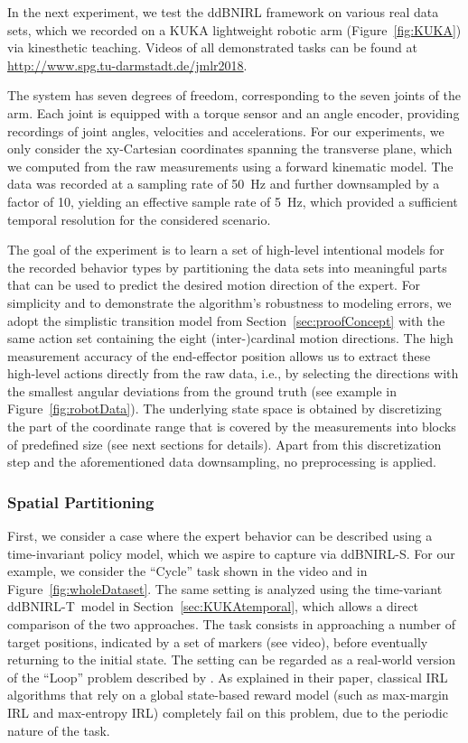 \documentclass[twoside,11pt]{article}
\newcommand{\ie}{i.e.}
\newcommand{\ddBNIRLT}{\mbox{ddBNIRL-T}}
\begin{document}
%
%
In the next experiment, we test the ddBNIRL framework on various real data sets, which we
recorded on a KUKA lightweight robotic arm (Figure~\ref{fig:KUKA}) via kinesthetic teaching. Videos of all demonstrated 
tasks %
can be found at \url{http://www.spg.tu-darmstadt.de/jmlr2018}.

The system has seven degrees of freedom, corresponding to the seven joints of the arm. Each joint is equipped with a torque sensor and an angle encoder, providing recordings of joint angles, velocities and accelerations. For our experiments, 
we only consider the xy-Cartesian coordinates spanning the transverse plane, %
which we computed from the raw measurements using a forward kinematic model. The data was recorded at a sampling rate of \SI{50}{\hertz} %
and %
further downsampled by a factor of 10, yielding an effective sample rate of \SI{5}{\hertz}, which provided a sufficient temporal resolution for the considered scenario. %



The goal of %
%
the experiment is to learn a set of high-level intentional models for the %
recorded behavior types by partitioning the %
data sets into %
meaningful %
parts that can be used to predict the desired motion direction of the expert. 
%
For simplicity and to demonstrate the algorithm's robustness to modeling errors, we adopt the simplistic transition model from Section~\ref{sec:proofConcept} with the same action set %
containing 
the eight %
(inter-)cardinal motion directions. The high measurement accuracy of the end-effector position allows us to extract these high-level actions %
%
directly from the %
raw data, \ie, by selecting %
%
%
the directions with the smallest %
angular deviations from the %
ground truth
%
(see example in Figure~\ref{fig:robotData}). %
%
The underlying 
state space is obtained by discretizing the %
part of the coordinate %
range that is 
covered by the measurements into blocks of %
predefined size (see next sections for details). Apart from this discretization step and the aforementioned data downsampling, no preprocessing %
is applied. 

\subsubsection{Spatial Partitioning}
First, we consider a case where the expert behavior can be described using a time-invariant policy model, which we aspire to capture via ddBNIRL-S. For our example, we %
consider the ``Cycle'' task shown in the video and in Figure~\ref{fig:wholeDataset}. The same setting is %
analyzed using the time-variant \ddBNIRLT\  model in Section~\ref{sec:KUKAtemporal}, which allows a direct comparison of the two approaches. %
The %
task consists in approaching a number of target positions, indicated by a set of markers (see video), %
before eventually returning to the initial state. The setting can be regarded as a real-world version of the ``Loop'' problem described by \citet{michini2012bayesian}. As explained in their paper, classical IRL algorithms that rely on a global state-based reward model (such as max-margin IRL and max-entropy IRL) completely fail on this problem, due to the periodic nature of the task.
\end{document}
